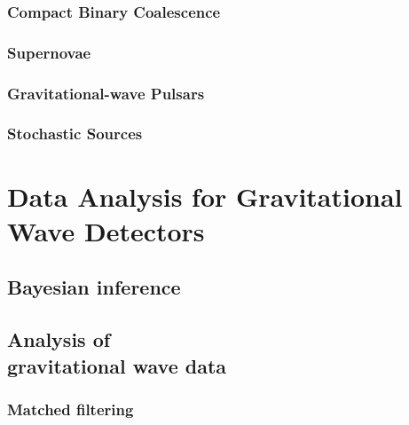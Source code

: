 \documentclass{kentigern}
\theoremstyle{definition}
\begin{document}




 \section{Compact Binary Coalescence}
 \label{sec:cbc}
 

 \section{Supernovae}
 \label{sec:sn}
 

 \section{Gravitational-wave Pulsars}
 \label{sec:pulsar}
 

 \section{Stochastic Sources}
 \label{sec:stochastic-sources}
 


\part{Data Analysis for Gravitational Wave Detectors}
\label{part:data-analysis}
 
\chapter{Bayesian inference}
\label{cha:bayesian-inference}
\chapterprecis{}



%

\chapter[Data Analysis]{Analysis of \\gravitational wave data}
\label{cha:data-analys-grav}
\chapterprecis{}

\section{Matched filtering}
\label{sec:matched-filtering}

\end{document}
